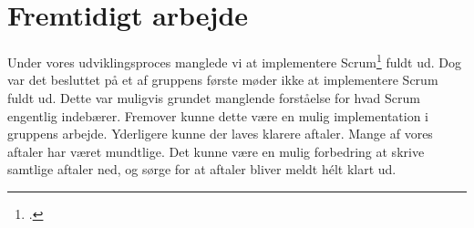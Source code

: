 \section{Fremtidigt arbejde}

Under vores udviklingsproces manglede vi at implementere Scrum\footcite{scrum} fuldt ud. Dog var det besluttet på et af gruppens første møder ikke at implementere Scrum fuldt ud. Dette var muligvis grundet manglende forståelse for hvad Scrum engentlig indebærer. Fremover kunne dette være en mulig implementation i gruppens arbejde.
Yderligere kunne der laves klarere aftaler. Mange af vores aftaler har været mundtlige. Det kunne være en mulig forbedring at skrive samtlige aftaler ned, og sørge for at aftaler bliver meldt hélt klart ud.